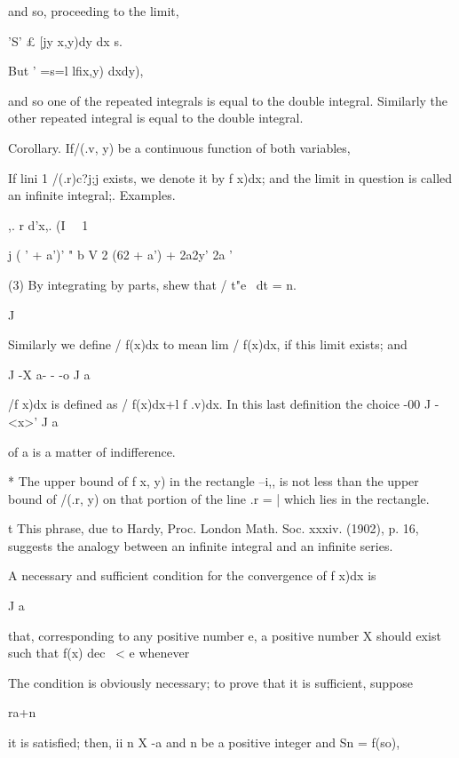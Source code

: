 and so, proceeding to the limit,

'S' £ [jy x,y)dy dx s.

But ' =s=l lfix,y) dxdy),

and so one of the repeated integrals is equal to the double integral.
Similarly the other repeated integral is equal to the double integral.

Corollary. If/(.v, y) be a continuous function of both variables,


If lini 1 /(.r)c?j;j exists, we denote it by f x)dx; and the limit in
question is called an infinite integral;. Examples.

,. r d'x,. (I \ \ 1

  j ( ' + a')' " b V 2 (62 + a') + 2a2y' 2a '

(3) By integrating by parts, shew that / t"e~ dt = n. 

J

Similarly we define / f(x)dx to mean lim / f(x)dx, if this limit
exists; and

J -X a- - -o J a

/f x)dx is defined as / f(x)dx+l f .v)dx. In this last definition the
choice -00 J -<x>' J a

of a is a matter of indifference.

* The upper bound of f x, y) in the rectangle --i,, is not less than
the upper bound of /(.r, y) on that portion of the line .r = | which
lies in the rectangle.

t This phrase, due to Hardy, Proc. London Math. Soc. xxxiv. (1902), p.
16, suggests the analogy between an infinite integral and an infinite
series.

%
%


A necessary and sufficient condition for the convergence of f x)dx is

J a

that, corresponding to any positive number e, a positive number X
should exist such that f(x) dec \ < e whenever

The condition is obviously necessary; to prove that it is sufficient,
suppose

ra+n

it is satisfied; then, ii n X -a and n be a positive integer and Sn =
f(so),

